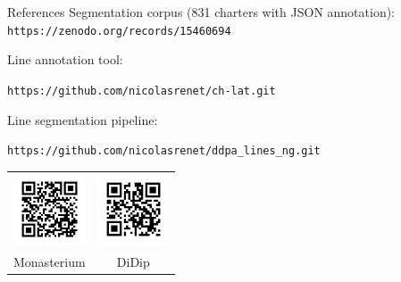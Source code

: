 \documentclass[a0paper,portrait]{baposter}
\begin{document}
\begin{poster}
\begin{posterbox}[name=references,column=2,below=segmentation,span=1,above=bottom,headerColorOne=white]{References}
\small
	Segmentation corpus (831 charters with JSON annotation): \texttt{https://zenodo.org/records/15460694}

\vspace{1em}
	Line annotation tool: 

	{\footnotesize \texttt{https://github.com/nicolasrenet/ch-lat.git}}
\vspace{1em}

	Line segmentation pipeline:
	
	{\footnotesize \texttt{https://github.com/nicolasrenet/ddpa\_lines\_ng.git}}

\vspace{2em}
\centering
\begin{tabular}{cc}
\includegraphics[width=2.1cm]{qr_monasterium.png} &
	\includegraphics[width=2.1cm]{qr_didip.png} \\
Monasterium & 
	DiDip
\end{tabular}
\end{posterbox}


\end{poster}
\end{document}
